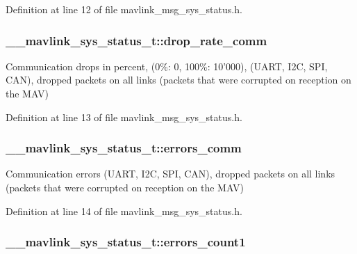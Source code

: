 Definition at line 12 of file mavlink\-\_\-msg\-\_\-sys\-\_\-status.\-h.

\hypertarget{struct____mavlink__sys__status__t_a08c165a0dcb2a852605e8abaaf9dfd78}{
\subsubsection[{drop\-\_\-rate\-\_\-comm}]{ \-\_\-\-\_\-mavlink\-\_\-sys\-\_\-status\-\_\-t\-::drop\-\_\-rate\-\_\-comm}}\label{struct____mavlink__sys__status__t_a08c165a0dcb2a852605e8abaaf9dfd78}


Communication drops in percent, (0\%\-: 0, 100\%\-: 10'000), (U\-A\-R\-T, I2\-C, S\-P\-I, C\-A\-N), dropped packets on all links (packets that were corrupted on reception on the M\-A\-V) 



Definition at line 13 of file mavlink\-\_\-msg\-\_\-sys\-\_\-status.\-h.

\hypertarget{struct____mavlink__sys__status__t_af144d0a152da70babf5ec86593e88700}{
\subsubsection[{errors\-\_\-comm}]{ \-\_\-\-\_\-mavlink\-\_\-sys\-\_\-status\-\_\-t\-::errors\-\_\-comm}}\label{struct____mavlink__sys__status__t_af144d0a152da70babf5ec86593e88700}


Communication errors (U\-A\-R\-T, I2\-C, S\-P\-I, C\-A\-N), dropped packets on all links (packets that were corrupted on reception on the M\-A\-V) 



Definition at line 14 of file mavlink\-\_\-msg\-\_\-sys\-\_\-status.\-h.

\hypertarget{struct____mavlink__sys__status__t_a11e2c7144a8d17da05c2f070d919bfc5}{
\subsubsection[{errors\-\_\-count1}]{ \-\_\-\-\_\-mavlink\-\_\-sys\-\_\-status\-\_\-t\-::errors\-\_\-count1}}\label{struct____mavlink__sys__status__t_a11e2c7144a8d17da05c2f070d919bfc5}


